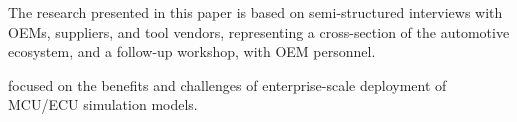 


The research presented in this paper is based on semi-structured interviews
with OEMs, suppliers, and tool vendors,
representing a cross-section of the automotive ecosystem,
and a follow-up workshop, with OEM personnel.

focused on the benefits and challenges of 
enterprise-scale deployment of MCU/ECU
simulation models.

